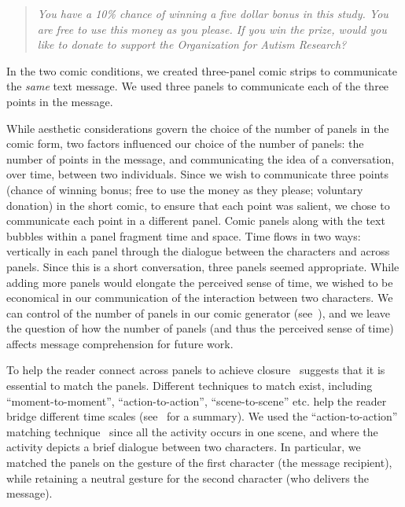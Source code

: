 \begin{quote}
  \textit{You have a 10\% chance of winning a five dollar bonus in this study. You are free to use this money as you please. If you win the prize, would you like to donate to support the Organization for Autism Research?}
\end{quote}

In the two comic conditions, we created three-panel comic strips to communicate the \textit{same} text message. We used three panels to communicate each of the three points in the message. 

While aesthetic considerations govern the choice of the number of panels in the comic form, two factors influenced our choice of the number of panels: the number of points in the message, and communicating the idea of a conversation, over time, between two individuals. Since we wish to communicate three points (chance of winning bonus; free to use the money as they please; voluntary donation) in the short comic, to ensure that each point was salient, we chose to communicate each point in a different panel. Comic panels along with the text bubbles within a panel fragment time and space. Time flows in two ways: vertically in each panel through the dialogue between the characters and across panels. Since this is a short conversation, three panels seemed appropriate. While adding more panels would elongate the perceived sense of time, we wished to be economical in our communication of the interaction between two characters. We can control of the number of panels in our comic generator (see~), and we leave the question of how the number of panels (and thus the perceived sense of time) affects message comprehension for future work.

To help the reader connect across panels to achieve closure~\textcite[][Chapter 3]{scott1993understanding} suggests that it is essential to match the panels. Different techniques to match exist, including ``moment-to-moment'', ``action-to-action'', ``scene-to-scene'' etc. help the reader bridge different time scales (see~\parencite[][p. 71]{scott1993understanding} for a summary). We used the ``action-to-action'' matching technique~\cite{scott1993understanding} since all the activity occurs in one scene, and where the activity depicts a brief dialogue between two characters. In particular, we matched the panels on the gesture of the first character (the message recipient), while retaining a neutral gesture for the second character (who delivers the message). 


